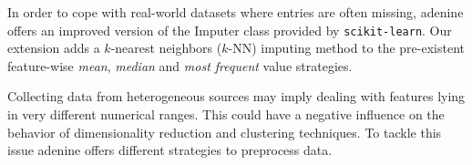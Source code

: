 \documentclass[twoside,11pt]{article}
\makeatletter
\newcommand{\ade}{{\sc adenine}\@\xspace}
\makeatother
\begin{document}
  In order to cope with real-world datasets where entries are often missing, \ade offers an improved version of the Imputer class provided by \texttt{scikit-learn}. Our extension adds a $k$-nearest neighbors ($k$-NN) imputing method to the pre-existent feature-wise \emph{mean}, \emph{median} and \emph{most frequent} value strategies. \citep{troyanskaya2001missing}


  Collecting data from heterogeneous sources may imply dealing with features lying in very different numerical ranges. This could have a negative influence on the behavior of dimensionality reduction and clustering techniques. To tackle this issue \ade offers different strategies to preprocess data.
\end{document}
